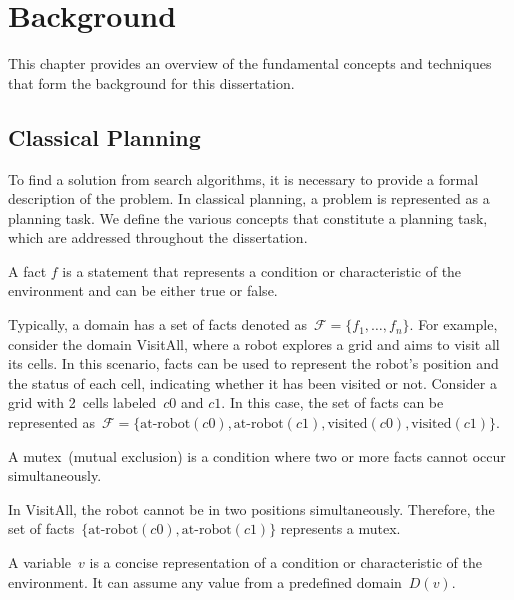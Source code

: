 \chapter{Background}
\label{sec:background}

This chapter provides an overview of the fundamental concepts and techniques that form the background for this dissertation.

\section{Classical Planning}
\label{sec:classical-planning}

To find a solution from search algorithms, it is necessary to provide a formal description of the problem. In classical planning, a problem is represented as a planning task. We define the various concepts that constitute a planning task, which are addressed throughout the dissertation.

\begin{definition}[Fact]
    \label{def:fact}
    A fact $f$ is a statement that represents a condition or characteristic of the environment and can be either true or false.
\end{definition}

Typically, a domain has a set of facts denoted as~$\mathcal{F} = \{f_1, \ldots, f_n\}$. For example, consider the domain VisitAll, where a robot explores a grid and aims to visit all its cells. In this scenario, facts can be used to represent the robot's position and the status of each cell, indicating whether it has been visited or not. Consider a grid with 2~cells labeled~$c0$ and $c1$. In this case, the set of facts can be represented as~$\mathcal{F} = \{\text{at-robot}(c0),\text{at-robot}(c1),\text{visited}(c0),\text{visited}(c1)\}$.

\begin{definition}[Mutex]
    \label{def:mutex}
    A mutex~(mutual exclusion) is a condition where two or more facts cannot occur simultaneously.
\end{definition}

In VisitAll, the robot cannot be in two positions simultaneously. Therefore, the set of facts~$\{\text{at-robot}(c0),\text{at-robot}(c1)\}$ represents a mutex.

\begin{definition}[Variable]
    \label{def:variable}
    A variable~$v$ is a concise representation of a condition or characteristic of the environment. It can assume any value from a predefined domain~$D(v)$.
\end{definition}

